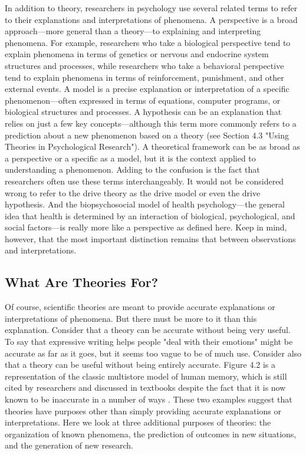  In addition to theory, researchers in psychology use several related terms to refer to their explanations and interpretations of phenomena. A perspective is a broad approach---more general than a theory---to explaining and interpreting phenomena. For example, researchers who take a biological perspective tend to explain phenomena in terms of genetics or nervous and endocrine system structures and processes, while researchers who take a behavioral perspective tend to explain phenomena in terms of reinforcement, punishment, and other external events. A model is a precise explanation or interpretation of a specific phenomenon---often expressed in terms of equations, computer programs, or biological structures and processes. A hypothesis can be an explanation that relies on just a few key concepts---although this term more commonly refers to a prediction about a new phenomenon based on a theory (see Section 4.3 "Using Theories in Psychological Research"). A theoretical framework can be as broad as a perspective or a specific as a model, but it is the context applied to understanding a phenomenon. Adding to the confusion is the fact that researchers often use these terms interchangeably. It would not be considered wrong to refer to the drive theory as the drive model or even the drive hypothesis. And the biopsychosocial model of health psychology---the general idea that health is determined by an interaction of biological, psychological, and social factors---is really more like a perspective as defined here. Keep in mind, however, that the most important distinction remains that between observations and interpretations.
 
 \subsection{What Are Theories For?}
 
 
Of course, scientific theories are meant to provide accurate explanations or interpretations of phenomena. But there must be more to it than this explanation. Consider that a theory can be accurate without being very useful. To say that expressive writing helps people "deal with their emotions" might be accurate as far as it goes, but it seems too vague to be of much use. Consider also that a theory can be useful without being entirely accurate. Figure 4.2 is a representation of the classic multistore model of human memory, which is still cited by researchers and discussed in textbooks despite the fact that it is now known to be inaccurate in a number of ways \citep{izawa_human_1999}. These two examples suggest that theories have purposes other than simply providing accurate explanations or interpretations. Here we look at three additional purposes of theories: the organization of known phenomena, the prediction of outcomes in new situations, and the generation of new research.
 
